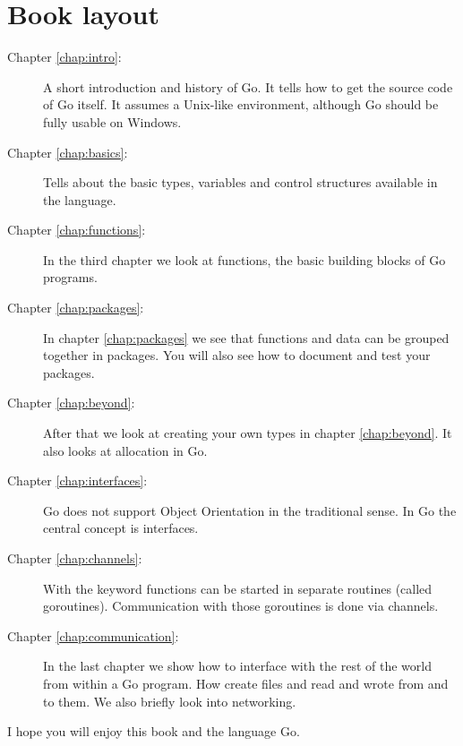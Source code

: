\section*{Book layout}
\begin{description}
\item[Chapter \ref{chap:intro}: ]
A short introduction and history of Go. It
tells how to get the source code of Go itself. It assumes a Unix-like environment, although
Go should be fully usable on Windows.

\item[Chapter \ref{chap:basics}: ] 
Tells about the basic types, variables and control
structures available in the language.

\item[Chapter \ref{chap:functions}: ] 
In the third chapter we look at functions, the basic building blocks of Go programs.

\item[Chapter \ref{chap:packages}: ] 
In chapter \ref{chap:packages} we see that functions and data can be grouped together
in packages. You will also see how to document and test your packages.

\item[Chapter \ref{chap:beyond}: ] 
After that we look at creating your own types in chapter \ref{chap:beyond}. It also
looks at allocation in Go.

\item[Chapter \ref{chap:interfaces}: ] 
Go does not support Object Orientation in the traditional sense.
In Go the central concept is interfaces.

\item[Chapter \ref{chap:channels}: ] 
With the  keyword functions can be started in separate routines (called goroutines). 
Communication with those goroutines is done via channels. 

\item[Chapter \ref{chap:communication}: ] 
In the last chapter we show how to interface with the rest of the world from within 
a Go program. How create files and read and wrote from and to them. We also briefly
look into networking.
\end{description}

I hope you will enjoy this book and the language Go.

